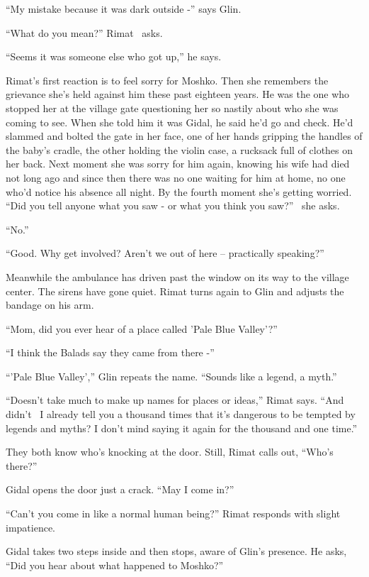 \documentclass[twoside,11pt]{book}
\begin{document}
``My mistake because it was dark outside -'' says Glin.

``What do you mean?'' Rimat \ asks.

``Seems it was someone else who got up,'' he says.

Rimat's first reaction is to feel sorry for Moshko. Then she remembers the grievance she's held against him these
past{ }eighteen years. He was the one who stopped her at the village gate questioning her so nastily
about who she was coming to see. When she told him it was Gidal, he said he'd go and check. He'd slammed and bolted the
gate in her face, one of her hands gripping the handles of the baby's cradle, the other holding the violin case, a
rucksack full of clothes on her back. Next moment she was sorry for him again, knowing his wife had died not long ago
and since then there was no one waiting for him at home, no one who'd notice his absence all night. By the fourth
moment she's getting worried. ``Did you tell anyone what you saw - or what you think you
saw?'' \ she asks.

``No.''

``Good. Why get involved? Aren't we out of here -- practically speaking?''

Meanwhile the ambulance has driven past the window on its way to the village center. The sirens have gone quiet. Rimat
turns again to Glin and adjusts the bandage on his arm.

``Mom, did you ever hear of a place called 'Pale Blue Valley'?''

``I think the Balads say they came from there -''

``'Pale Blue Valley','' Glin repeats the name. ``Sounds like a legend, a
myth.''

``Doesn't take much to make up names for places or ideas,'' Rimat says. ``And
didn't \ I already tell you a thousand times that it's dangerous to be tempted by legends and myths? I don't mind
saying it again for the thousand and one time.''

They both know who's knocking at the door. Still, Rimat calls out, ``Who's there?''

Gidal opens the door just a crack. ``May I come in?''

``Can't you come in like a normal human being?'' Rimat responds with slight
impatience{. \ }

Gidal takes two steps inside and then stops, aware of Glin's presence. He asks, ``Did you hear about what
happened to Moshko?''
\end{document}
